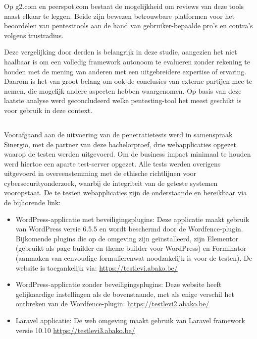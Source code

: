 Op g2.com en peerspot.com bestaat de 
mogelijkheid om reviews van deze tools naast elkaar te leggen. Beide zijn bewezen betrouwbare platformen voor het beoordelen 
van pentesttools aan de hand van gebruiker-bepaalde pro's en contra's volgens trustradius. 

Deze vergelijking door derden is belangrijk in deze studie, aangezien het niet haalbaar is om een volledig framework 
autonoom te evalueren zonder rekening te houden met de mening van anderen met een uitgebreidere expertise of ervaring. Daarom 
is het van groot belang om ook de conclusies van externe partijen mee te nemen, die mogelijk andere 
aspecten hebben waargenomen. Op basis van deze laatste analyse werd geconcludeerd welke pentesting-tool het meest 
geschikt is voor gebruik in deze context.

\subsection{}
Voorafgaand aan de uitvoering van de penetratietests werd in samenspraak Sinergio, met de partner van deze bachelorproef, drie 
webapplicaties opgezet waarop de testen werden uitgevoerd. Om de business impact minimaal te houden werd hiertoe een 
aparte test-server opgezet. Alle tests werden overigens uitgevoerd in overeenstemming met de ethische 
richtlijnen voor cybersecurityonderzoek, waarbij de integriteit van de geteste systemen vooropstaat. De te testen 
webapplicaties zijn de onderstaande en bereikbaar via de bijhorende link:

\begin{itemize}
    \item WordPress-applicatie met beveiligingsplugins: Deze applicatie maakt gebruik van WordPress versie 6.5.5 en wordt 
    beschermd door de Wordfence-plugin. Bijkomende plugins die op de omgeving zijn geïnstalleerd, zijn Elementor 
    (gebruikt als page builder en theme builder voor WordPress) en Forminator (aanmaken van eenvoudige formulierenwat noodzakelijk is voor de testen).  
    De website is toegankelijk via: \url{https://testlevi.abako.be/}
    \item WordPress-applicatie zonder beveiligingsplugins: Deze website heeft gelijkaardige instellingen als de bovenstaande, 
    met als enige verschil het ontbreken van de Wordfence-plugin: \url{https://testlevi2.abako.be/}
    \item Laravel applicatie: De web omgeving maakt gebruik van Laravel framework versie 10.10 \url{https://testlevi3.abako.be/}
\end{itemize}

